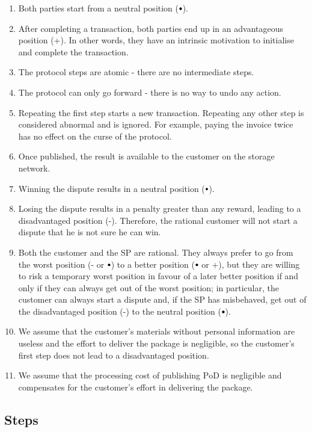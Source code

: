 \documentclass[pdftex,twocolumn,epjc3]{svjour3}
\newcommand{\plus}{+}
\newcommand{\minus}{-}
\newcommand\neutral[1][.75]{\mathbin{\ThisStyle{\vcenter{\hbox{%
  \scalebox{#1}{$\SavedStyle\bullet$}}}}}%
}
\begin{document}
{\begin{enumerate}
\item Both parties start from a neutral position ($\neutral$).
\item After completing a transaction, both parties end up in an advantageous position (\plus{}). In other words, they have an intrinsic motivation to initialise and complete the transaction.
\item The protocol steps are atomic - there are no intermediate steps.
\item The protocol can only go forward - there is no way to undo any action.
\item Repeating the first step starts a new transaction. Repeating any other step is considered abnormal and is ignored. For example, paying the invoice twice has no effect on the curse of the protocol.
\item Once published, the result is available to the customer on the storage network. 
\item Winning the dispute results in a neutral position ($\neutral$).
\item Losing the dispute results in a penalty greater than any reward, leading to a disadvantaged position (\minus{}). Therefore, the rational customer will not start a dispute that he is not sure he can win.
\item Both the customer and the SP are rational. They always prefer to go from the worst position (\minus{} or $\neutral${}) to a better position ($\neutral$ or \plus), but they are willing to risk a temporary worst position in favour of a later better position if and only if they can always get out of the worst position; in particular, the customer can always start a dispute and, if the SP has misbehaved, get out of the disadvantaged position (\minus) to the neutral position ($\neutral$).
\item We assume that the customer's materials without personal information are useless and the effort to deliver the package is negligible, so the customer's first step does not lead to a disadvantaged position.
\item We assume that the processing cost of publishing $\mathrm{PoD}$ is negligible and compensates for the customer's effort in delivering the package.
\end{enumerate}

\subsection{Steps}\label{sec:steps}

}
\end{document}
